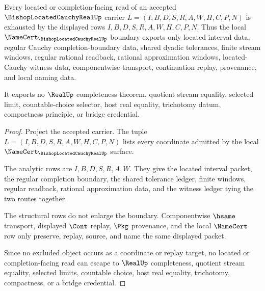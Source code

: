 \begin{theorem}
\label{thm:bishop-located-cauchy-real-nonescape}
Every located or completion-facing read of an accepted $\BishopLocatedCauchyRealUp$ carrier $L=(I,B,D,S,R,A,W,H,C,P,N)$ is exhausted by the displayed rows $I,B,D,S,R,A,W,H,C,P,N$. Thus the local $\NameCert_{\BishopLocatedCauchyRealUp}$ boundary exports only located interval data, regular Cauchy completion-boundary data, shared dyadic tolerances, finite stream windows, regular rational readback, rational approximation windows, located-Cauchy witness data, componentwise transport, continuation replay, provenance, and local naming data.

It exports no $\RealUp$ completeness theorem, quotient stream equality, selected limit, countable-choice selector, host real equality, trichotomy datum, compactness principle, or bridge credential.
\end{theorem}
\begin{proof}
Project the accepted carrier. The tuple $L=(I,B,D,S,R,A,W,H,C,P,N)$ lists every coordinate admitted by the local $\NameCert_{\BishopLocatedCauchyRealUp}$ surface.

The analytic rows are $I,B,D,S,R,A,W$. They give the located interval packet, the regular completion boundary, the shared tolerance ledger, finite windows, regular readback, rational approximation data, and the witness ledger tying the two routes together.

The structural rows do not enlarge the boundary. Componentwise $\hsame$ transport, displayed $\Cont$ replay, $\Pkg$ provenance, and the local $\NameCert$ row only preserve, replay, source, and name the same displayed packet.

Since no excluded object occurs as a coordinate or replay target, no located or completion-facing read can escape to $\RealUp$ completeness, quotient stream equality, selected limits, countable choice, host real equality, trichotomy, compactness, or a bridge credential.
\end{proof}


